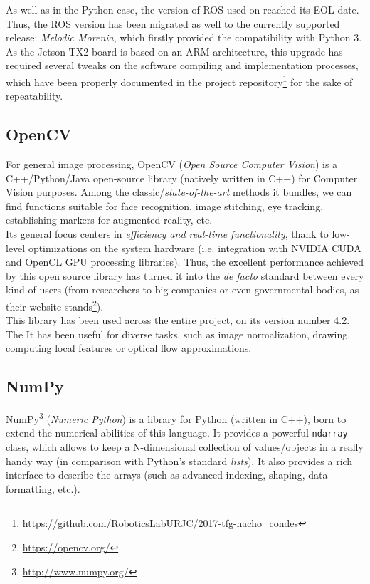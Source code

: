 As well as in the Python case, the version of ROS used on \cite{tfg} reached its EOL date. Thus, the ROS version has been migrated as well to the currently supported release: \textit{Melodic Morenia}, which firstly provided the compatibility with Python 3. As the Jetson TX2 board is based on an ARM architecture, this upgrade has required several tweaks on the software compiling and implementation processes, which have been properly documented in the project repository\footnote{\url{https://github.com/RoboticsLabURJC/2017-tfg-nacho_condes}} for the sake of repeatability.\\


\subsection{OpenCV}
For general image processing, OpenCV (\emph{Open Source Computer Vision}) is a C++/Python/Java open-source library (natively written in C++) for Computer Vision purposes. Among the classic/\emph{state-of-the-art} methods it bundles, we can find functions suitable for face recognition, image stitching, eye tracking, establishing markers for augmented reality, etc.\\

Its general focus centers in \emph{efficiency and real-time functionality}, thank to low-level optimizations on the system hardware (i.e. integration with NVIDIA CUDA and OpenCL GPU processing libraries). Thus, the excellent performance achieved by this open source library has turned it into the \emph{de facto} standard between every kind of users (from researchers to big companies or even governmental bodies, as their website stands\footnote{\url{https://opencv.org/}}).\\

This library has been used across the entire project, on its version number 4.2. The It has been useful for diverse tasks, such as image normalization, drawing, computing local features or optical flow approximations.


\subsection{NumPy}

NumPy\footnote{\url{http://www.numpy.org/}} (\emph{Numeric Python}) is a library for Python (written in C++), born to extend the numerical abilities of this language. It provides a powerful \texttt{ndarray} class, which allows to keep a N-dimensional collection of values/objects in a really handy way (in comparison with Python's standard \emph{lists}). It also provides a rich interface to describe the arrays (such as advanced indexing, shaping, data formatting, etc.).\\


